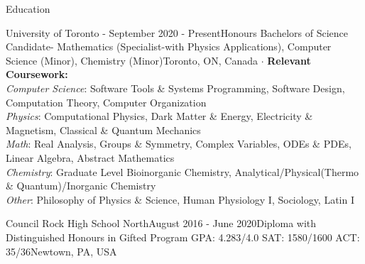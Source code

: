 \documentclass[UTF8]{resume} %
\begin{document}
\begin{rSection}{Education}

\begin{rSubsection}{University of Toronto - }{September 2020 - Present}{Honours Bachelors of Science Candidate- Mathematics (Specialist-with Physics Applications), Computer Science (Minor), Chemistry (Minor)}{Toronto, ON, Canada}
    \scriptsize{
    $\cdot$ \textbf{Relevant Coursework:} \\
    \textit{Computer Science}: Software Tools \& Systems Programming, Software Design, Computation Theory, Computer Organization \\
    \textit{Physics}:  Computational Physics, Dark Matter \& Energy, Electricity \& Magnetism, Classical \& Quantum Mechanics \\
    \textit{Math}: Real Analysis, Groups \& Symmetry, Complex Variables, ODEs \& PDEs, Linear Algebra, Abstract Mathematics\\
    \textit{Chemistry}: Graduate Level Bioinorganic Chemistry, Analytical/Physical(Thermo \& Quantum)/Inorganic Chemistry}\\
    \textit{Other}: Philosophy of Physics \& Science, Human Physiology I, Sociology, Latin I
\end{rSubsection}
\begin{rSubsection}{Council Rock High School North}{August 2016 - June 2020}{Diploma with Distinguished Honours in Gifted Program GPA: 4.283/4.0  SAT: 1580/1600  ACT: 35/36}{Newtown, PA, USA}
    \end{rSubsection}
\end{rSection}
\end{document}
